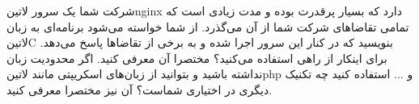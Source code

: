 \documentclass[../main.tex]{subfiles}
\begin{document}

شرکت شما یک سرور ‌لاتین{nginx} دارد که بسیار پرقدرت بوده و مدت زیادی است که تمامی تقاضاهای شرکت شما از آن می‌گذرد. از شما خواسته می‌شود برنامه‌ای به زبان ‌لاتین{C} بنویسید که در کنار این سرور اجرا شده و به برخی از تقاضاها پاسخ می‌دهد. برای اینکار از راهی استفاده می‌کنید؟ مختصرا آن معرفی کنید.
اگر محدودیت زبان نداشته باشید و بتوانید از زبان‌های اسکریپتی مانند ‌لاتین{php} و ... استفاده کنید چه تکنیک دیگری در اختیاری شماست؟ آن نیز مختصرا معرفی کنید.
\end{document}
